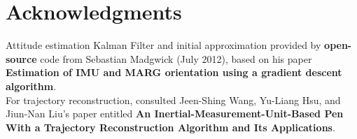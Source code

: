 \documentclass{article}
\begin{document}
\section*{Acknowledgments} 
 
Attitude estimation Kalman Filter and initial approximation provided by \textbf{open-source} code from Sebastian Madgwick (July 2012), based on his paper \textbf{Estimation of IMU and MARG orientation using a gradient descent algorithm}.\\
For trajectory reconstruction, consulted Jeen-Shing Wang, Yu-Liang Hsu, and Jiun-Nan Liu's paper entitled \textbf{An Inertial-Measurement-Unit-Based Pen With a Trajectory Reconstruction Algorithm and Its Applications}.


\end{document}
